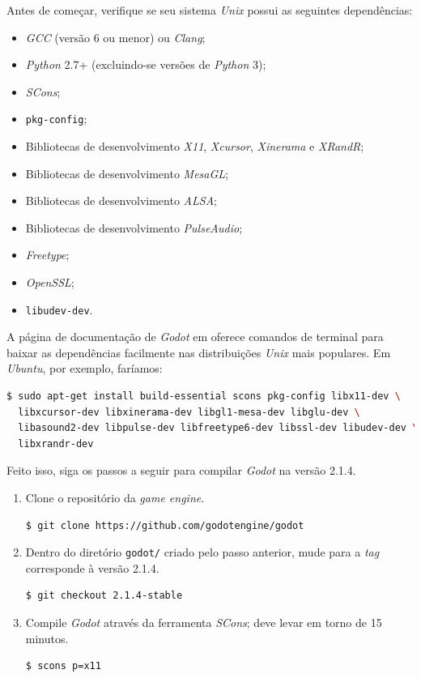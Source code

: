 Antes de começar, verifique se seu sistema \textit{Unix} possui as seguintes dependências:

\begin{itemize}
\item \textit{GCC} (versão 6 ou menor) ou \textit{Clang};
\item \textit{Python} 2.7+ (excluindo-se versões de \textit{Python} 3);
\item \textit{SCons};
\item \texttt{pkg-config};
\item Bibliotecas de desenvolvimento \textit{X11}, \textit{Xcursor}, \textit{Xinerama} e \textit{XRandR};
\item Bibliotecas de desenvolvimento \textit{MesaGL};
\item Bibliotecas de desenvolvimento \textit{ALSA};
\item Bibliotecas de desenvolvimento \textit{PulseAudio};
\item \textit{Freetype};
\item \textit{OpenSSL};
\item \texttt{libudev-dev}.
\end{itemize}

A página de documentação de \textit{Godot} em \citep{godotReq} oferece comandos de terminal para baixar as dependências facilmente nas distribuições \textit{Unix} mais populares. Em \textit{Ubuntu}, por exemplo, faríamos:

\begin{lstlisting}[language=Bash]
$ sudo apt-get install build-essential scons pkg-config libx11-dev \
  libxcursor-dev libxinerama-dev libgl1-mesa-dev libglu-dev \
  libasound2-dev libpulse-dev libfreetype6-dev libssl-dev libudev-dev \
  libxrandr-dev
\end{lstlisting}

Feito isso, siga os passos a seguir para compilar \textit{Godot} na versão 2.1.4.

\begin{enumerate}
\item Clone o repositório da \textit{game engine}.

\begin{lstlisting}[language=Bash]
$ git clone https://github.com/godotengine/godot
\end{lstlisting}

\item Dentro do diretório \texttt{godot/} criado pelo passo anterior, mude para a \textit{tag} corresponde à versão 2.1.4.

\begin{lstlisting}[language=Bash]
$ git checkout 2.1.4-stable
\end{lstlisting}

\item Compile \textit{Godot} através da ferramenta \textit{SCons}; deve levar em torno de 15 minutos.

\begin{lstlisting}[language=Bash]
$ scons p=x11
\end{lstlisting}
\end{enumerate}

